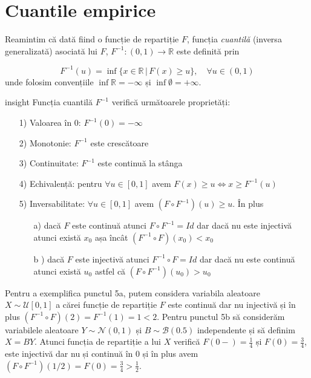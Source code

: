 \documentclass[]{article}
\newenvironment{frshaded_insight*}{%
  \def\FrameCommand{\fboxrule=\FrameRule\fboxsep=\FrameSep \fcolorbox{framecolor_insight}{shadecolor_insight}}%
  \MakeFramed {\advance\hsize-\width \FrameRestore}}%
{\endMakeFramed}
\newenvironment{rmdblock_insight}[1]
  {\begin{frshaded_insight*}
  \begin{itemize}
  \renewcommand{\labelitemi}{
    \raisebox{-.7\height}[0pt][0pt]{
      {\setkeys{Gin}{width=2em,keepaspectratio}\texttt{[image: images/icons/\#1]}}
    }
  }
  \item
  }
  {
  \end{itemize}
  \end{frshaded_insight*}
  }
\newenvironment{rmdinsight}
  {\begin{rmdblock_insight}{insight}}
  {\end{rmdblock_insight}}
\begin{document}
\hypertarget{cuantile-empirice}{%
\section{Cuantile empirice}\label{cuantile-empirice}}

Reamintim că dată fiind o funcție de repartiție \(F\), funcția
\emph{cuantilă} (inversa generalizată) asociată lui \(F\),
\(F^{-1}:(0,1)\to\mathbb{R}\) este definită prin

\[
  F^{-1}(u) = \inf\{x\in\mathbb{R}\,|\,F(x)\geq u\}, \quad \forall u\in(0,1)
\] unde folosim convențiile \(\inf\mathbb{R} = -\infty\) și
\(\inf\emptyset = +\infty\).

\begin{rmdinsight}
Funcția cuantilă \(F^{-1}\) verifică următoarele proprietăți:

\begin{itemize}
  \item[1)] Valoarea în $0$: $F^{-1}(0) = -\infty$
  \item[2)] Monotonie: $F^{-1}$ este crescătoare
  \item[3)] Continuitate: $F^{-1}$ este continuă la stânga
  \item[4)] Echivalență: pentru $\forall u\in[0,1]$ avem $F(x)\geq u \iff x\geq F^{-1}(u)$
  \item[5)] Inversabilitate: $\forall u\in[0,1]$ avem $(F\circ F^{-1})(u)\geq u$. În plus
    \begin{itemize}
      \item[a)] dacă $F$ este continuă atunci $F\circ F^{-1} = Id$ dar dacă nu este injectivă atunci există $x_0$ așa încât $(F^{-1}\circ F)(x_0)<x_0$
      \item[b]) dacă $F$ este injectivă atunci $F^{-1}\circ F = Id$ dar dacă nu este continuă atunci există $u_0$ astfel că $(F\circ F^{-1})(u_0)>u_0$
    \end{itemize}
\end{itemize}
\end{rmdinsight}

Pentru a exemplifica punctul 5a, putem considera variabila aleatoare
\(X\sim\mathcal{U}[0,1]\) a cărei funcție de repartiție \(F\) este
continuă dar nu injectivă și în plus
\((F^{-1}\circ F)(2) = F^{-1}(1) = 1 < 2\). Pentru punctul 5b să
considerăm variabilele aleatoare \(Y\sim\mathcal{N}(0,1)\) și
\(B\sim\mathcal{B}(0.5)\) independente și să definim \(X = BY\). Atunci
funcția de repartiție a lui \(X\) verifică \(F(0-) = \frac{1}{4}\) și
\(F(0) = \frac{3}{4}\), este injectivă dar nu și continuă în \(0\) și în
plus avem \((F\circ F^{-1})(1/2) = F(0) = \frac{3}{4}>\frac{1}{2}\).
\end{document}
